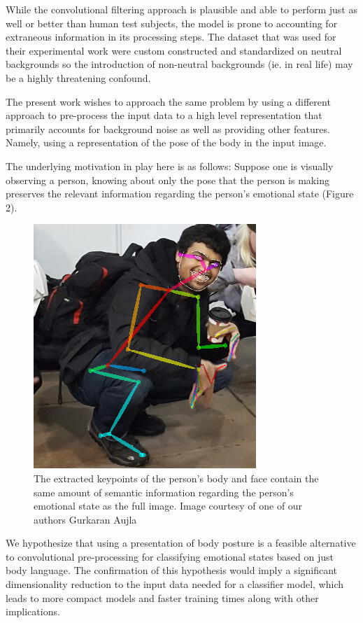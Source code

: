 \documentclass{article}
\begin{document}
While the convolutional filtering approach is plausible and able to perform just as well or better than human test subjects, the model is prone to accounting for extraneous information in its processing steps. The dataset that was used for their experimental work were custom constructed and standardized on neutral backgrounds so the introduction of non-neutral backgrounds (ie. in real life) may be a highly threatening confound.

The present work wishes to approach the same problem by using a different approach to pre-process the input data to a high level representation that primarily accounts for background noise as well as providing other features. Namely, using a representation of the pose of the body in the input image.

The underlying motivation in play here is as follows: Suppose one is visually observing a person, knowing about only the pose that the person is making preserves the relevant information regarding the person's emotional state (Figure 2).

\begin{figure}[h]
	\centering
	\includegraphics[scale=0.4]{kran}
	\caption{The extracted keypoints of the person's body and face contain the same amount of semantic information regarding the person's emotional state as the full image. Image courtesy of one of our authors Gurkaran Aujla}
\end{figure}

We hypothesize that using a presentation of body posture is a feasible alternative to convolutional pre-processing for classifying emotional states based on just body language. The confirmation of this hypothesis would imply a significant dimensionality reduction to the input data needed for a classifier model, which leads to more compact models and faster training times along with other implications.
\end{document}
